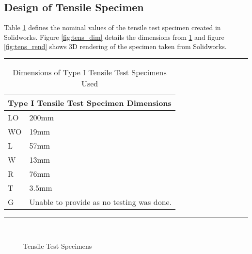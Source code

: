\subsection{Design of Tensile Specimen}

Table \ref{tab:rep_tensile_dimensions} defines the nominal values of the tensile test specimen created in Solidworks. Figure \ref{fig:tens_dim} details the dimensions from \ref{tab:rep_tensile_dimensions} and figure \ref{fig:tens_rend} shows 3D rendering of the specimen taken from Solidworks.

	\begin{table} [H]
		\centering
		\hrule height 2pt 
		\begin{tabularx}{\textwidth}{ | l | X | }
			\multicolumn{2}{|c|}{Type I Tensile Test Specimen Dimensions} \\ \hline
			LO & 200mm\\
			WO & 19mm\\
			L & 57mm\\
			W & 13mm\\
			R & 76mm\\
			T & 3.5mm\\
			G & Unable to provide as no testing was done. \\
		\end{tabularx}
		\hrule height 2pt 
		\caption{Dimensions of Type I Tensile Test Specimens Used}
		\label{tab:rep_tensile_dimensions}
	\end{table}


\begin{figure} [h]
\centering
	\caption{\label{ref_label_overall}Tensile Test Specimens}
	\
	\
\end{figure}